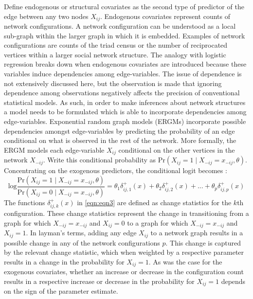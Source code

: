 \documentclass[a4paper, man, floatsintext]{apa6}
\begin{document}
Define endogenous or structural covariates as the second type of predictor of the edge between any two nodes $X_{ij}$. Endogenous covariates represent counts of network configurations. A network configuration can be understood as a local sub-graph within the larger graph in which it is embedded. Examples of network configurations are counts of the triad census or the number of reciprocated vertices within a larger social network structure. The analogy with logistic regression breaks down when endogenous covariates are introduced because these variables induce dependencies among edge-variables. The issue of dependence is not extensively discussed here, but the observation is made that ignoring dependence among observations negatively affects the precision of conventional statistical models. As such, in order to make inferences about network structures a model needs to be formulated which is able to incorporate dependencies among edge-variables. Exponential random graph models (ERGMs) incorporate possible dependencies amongst edge-variables by predicting the probability of an edge conditional on what is observed in the rest of the network. More formally, the ERGM models each edge-variable $X_{ij}$ conditional on the other vertices in the network $X_{-ij}$. Write this conditional probability as $\text{Pr}(X_{ij}=1 \mid X_{−ij} = x_{−ij}, \theta)$. Concentrating on the exogenous predictors, the conditional logit becomes : \begin{equation} \label{eqn:eqn3} \text{log}\frac{\text{Pr}(X_{ij} = 1 \mid X_{-ij} = x_{-ij}, \theta)}{\text{Pr}(X_{ij} = 0 \mid X_{-ij} = x_{-ij}, \theta)} = \theta_{1}\delta_{ij,1}^{+}(x) + \theta_{2}\delta_{ij,2}^{+}(x) + ... + \theta_{p}\delta_{ij, p}^{+}(x) \end{equation} The functions $\delta_{ij,k}^{+}(x)$ in \eqref{eqn:eqn3} are defined as change statistics for the $k$th configuration. These change statistics represent the change in transitioning from a graph for which $X_{−ij} = x_{−ij}$ and $X_{ij} = 0$ to a graph for which $X_{−ij} = x_{−ij}$ and $X_{ij} = 1$. In layman's terms,  adding any edge $X_{ij}$ to a network graph results in a possible change in any of the network configurations $p$. \clearpage \noindent This change is captured by the relevant change statistic, which when weighted by a respective parameter results in a change in the probability for $X_{ij} = 1$. As was the case for the exogenous covariates, whether an increase or decrease in the configuration count results in a respective increase or decrease in the probability for $X_{ij} = 1$ depends on the sign of the parameter estimate.  
\end{document}
